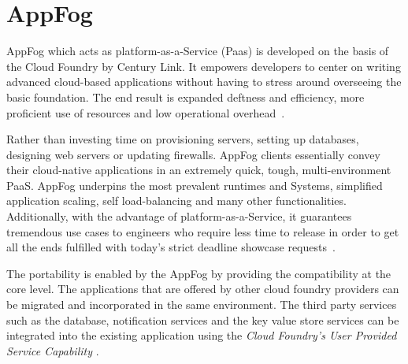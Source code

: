 \section{AppFog}

AppFog which acts as platform-as-a-Service (Paas) is developed on the
basis of the Cloud Foundry by Century Link. It empowers developers to
center on writing advanced cloud-based applications without having to
stress around overseeing the basic foundation. The end result is
expanded deftness and efficiency, more proficient use of resources and
low operational overhead~\cite{hid-sp18-412-century_link_appfog}.

Rather than investing time on provisioning servers, setting up
databases, designing web servers or updating firewalls. AppFog clients
essentially convey their cloud-native applications in an extremely
quick, tough, multi-environment PaaS. AppFog underpins the most
prevalent runtimes and Systems, simplified application scaling, self
load-balancing and many other functionalities. Additionally, with the
advantage of platform-as-a-Service, it guarantees tremendous use cases
to engineers who require less time to release in order to get all the
ends fulfilled with today's strict deadline showcase
requests~\cite{hid-sp18-412-century_link_appfog}.

The portability is enabled by the AppFog by providing the
compatibility at the core level. The applications that are offered by
other cloud foundry providers can be migrated and incorporated in the
same environment.  The third party services such as the database,
notification services and the key value store services can be
integrated into the existing application using the \emph{Cloud Foundry's
User Provided Service Capability}
\cite{hid-sp18-412-century_link_appfog}.

